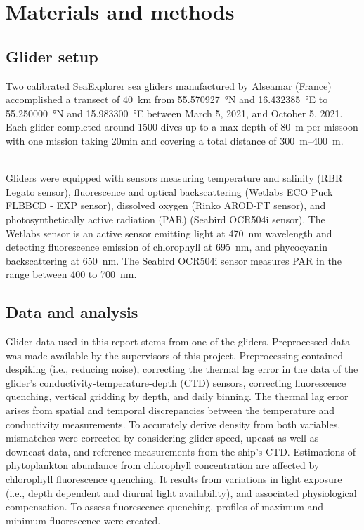 \documentclass[../Main.tex]{subfiles}
\begin{document}
\section*{\crule[blue]{.3cm}{.3cm} Materials and methods}
\subsection*{\crule[blue]{.2cm}{.2cm} Glider setup}
Two calibrated SeaExplorer sea gliders manufactured by Alseamar (France) accomplished a transect of \SI{40}{km} from \SI{55.570927}{\degree}N and \SI{16.432385}{\degree}E to \SI{55.250000}{\degree}N and \SI{15.983300}{\degree}E between March 5, 2021, and October 5, 2021. 
Each glider completed around 1500 dives up to a max depth of \SI{80}{m} per missoon with one mission taking 20min and covering a total distance of \SIrange{300}{400}{m}. 

\\ 
Gliders were equipped with sensors measuring temperature and salinity (RBR Legato sensor), fluorescence and optical backscattering (Wetlabs ECO Puck FLBBCD - EXP sensor), dissolved oxygen (Rinko AROD-FT sensor), and photosynthetically active radiation (PAR) (Seabird OCR504i sensor). 
The Wetlabs sensor is an active sensor emitting light at \SI{470}{nm} wavelength and detecting fluorescence emission of chlorophyll at \SI{695}{nm}, and phycocyanin backscattering at \SI{650}{nm}. 
The Seabird OCR504i sensor measures PAR in the range between 400 to \SI{700}{nm}\supercite{ACSA2014}.

\subsection*{\crule[blue]{.2cm}{.2cm} Data and analysis}
Glider data used in this report stems from one of the gliders. 
Preprocessed data was made available by the supervisors of this project. 
Preprocessing contained despiking (i.e., reducing noise), correcting the thermal lag error in the data of the glider's conductivity-temperature-depth (CTD) sensors, correcting fluorescence quenching, vertical gridding by depth, and daily binning.
The thermal lag error arises from spatial and temporal discrepancies between the temperature and conductivity measurements\supercite{Garau2011}.
To accurately derive density from both variables, mismatches were corrected by considering glider speed, upcast as well as downcast data, and reference measurements from the ship's CTD. 
Estimations of phytoplankton abundance from chlorophyll concentration are affected by chlorophyll fluorescence quenching. 
It results from variations in light exposure (i.e., depth dependent and diurnal light availability), and associated physiological compensation\supercite{Thomalla2018}. 
To assess fluorescence quenching, profiles of maximum and minimum fluorescence were created.
\end{document}
